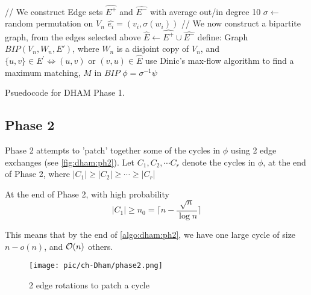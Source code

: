 \begin{algorithm}[!ht]
\AlgoFontSize
\DontPrintSemicolon

\BlankLine
// We construct Edge sets $\hat{E^+}$ and $\hat{E^-}$ with average out/in degree 10\;
$\sigma \leftarrow$ random permutation on $V_n$ \;
 {
    $\hat{e_i} = (v_i, \sigma(w_i))$\;
}
\BlankLine
// We now construct a bipartite graph, from the edges selected above\;
$\hat{E} \leftarrow \hat{E^+} \cup \hat{E^-}$\;
define: Graph $BIP(V_n, W_n, E')$, where $W_n$ is a disjoint copy of $V_n$, and\;
$\{u, v\} \in E^{'} \iff (u, v) \text{ or } (v, u)\in \hat{E}$\;
use Dinic's max-flow algorithm \cite{dinic:flow} to find a maximum matching, $M$ in $BIP$\;
\BlankLine
{}
\BlankLine
\Return $\phi = \sigma^{-1}\psi$

\caption{Psuedocode for DHAM Phase 1.}
\label{algo:dham:ph1}
\end{algorithm}



\subsection{Phase 2}
Phase 2 attempts to 'patch' together some of the cycles in $\phi$ using 2 edge exchanges (see \autoref{fig:dham:ph2}). Let $C_1, C_2, \cdots C_r$ denote the cycles in $\phi$, at the end of Phase 2, where $|C_1| \ge |C_2| \ge \cdots \ge |C_r$|
\begin{lemma}
At the end of Phase 2, with high probability
\[ |C_1| \ge n_0 = \Big\lceil n - \frac{\sqrt{n}}{\log n} \Big\rceil\]
\end{lemma}
This means that by the end of  \autoref{algo:dham:ph2}, we have one large cycle of size $n - o(n)$, and $\mathcal{O}(n)$ others. 

\begin{figure}[ht]
\centering
\texttt{[image: pic/ch-Dham/phase2.png]}
\caption{2 edge rotations to patch a cycle}
\label{fig:dham:ph2}
\end{figure}

